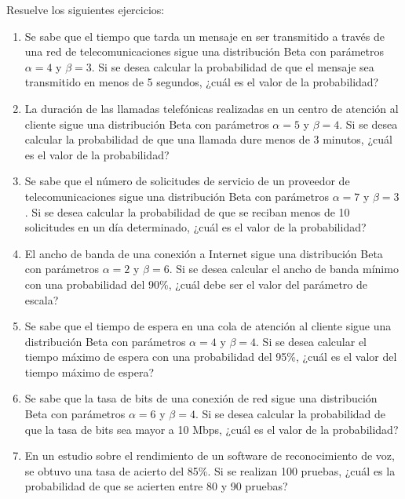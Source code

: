 \begin{Ejer}
Resuelve los siguientes ejercicios:
\begin{enumerate}

\item Se sabe que el tiempo que tarda un mensaje en ser transmitido a través de una red de telecomunicaciones sigue una distribución Beta con parámetros $\alpha=4$ y $\beta=3$. Si se desea calcular la probabilidad de que el mensaje sea transmitido en menos de 5 segundos, ¿cuál es el valor de la probabilidad?

\item La duración de las llamadas telefónicas realizadas en un centro de atención al cliente sigue una distribución Beta con parámetros $\alpha=5$ y $\beta=4$. Si se desea calcular la probabilidad de que una llamada dure menos de 3 minutos, ¿cuál es el valor de la probabilidad?

\item Se sabe que el número de solicitudes de servicio de un proveedor de telecomunicaciones sigue una distribución Beta con parámetros $\alpha=7$ y $\beta=3$. Si se desea calcular la probabilidad de que se reciban menos de 10 solicitudes en un día determinado, ¿cuál es el valor de la probabilidad?

\item El ancho de banda de una conexión a Internet sigue una distribución Beta con parámetros $\alpha=2$ y $\beta=6$. Si se desea calcular el ancho de banda mínimo con una probabilidad del 90\%, ¿cuál debe ser el valor del parámetro de escala?

\item Se sabe que el tiempo de espera en una cola de atención al cliente sigue una distribución Beta con parámetros $\alpha=4$ y $\beta=4$. Si se desea calcular el tiempo máximo de espera con una probabilidad del 95\%, ¿cuál es el valor del tiempo máximo de espera?

\item Se sabe que la tasa de bits de una conexión de red sigue una distribución Beta con parámetros $\alpha=6$ y $\beta=4$. Si se desea calcular la probabilidad de que la tasa de bits sea mayor a 10 Mbps, ¿cuál es el valor de la probabilidad?

\item En un estudio sobre el rendimiento de un software de reconocimiento de voz, se obtuvo una tasa de acierto del 85\%. Si se realizan 100 pruebas, ¿cuál es la probabilidad de que se acierten entre 80 y 90 pruebas?


\end{enumerate}
\end{Ejer}
